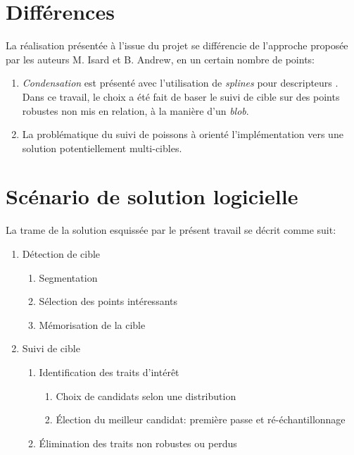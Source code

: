 \documentclass[a4paper,11pt]{report}
\begin{document}

\section{Différences}
La réalisation présentée à l'issue du projet se différencie de l'approche proposée par les auteurs M. Isard et B. Andrew, en un certain nombre de points:
\begin{enumerate}
\item \textit{Condensation} est présenté avec l'utilisation de \textit{splines} pour descripteurs \cite{condIsard}. Dans ce travail, le choix a été fait de baser le suivi de cible sur des points robustes non mis en relation, à la manière d'un \textit{blob}.
\item La problématique du suivi de poissons à orienté l'implémentation vers une solution potentiellement multi-cibles.
\end{enumerate}


\section{Scénario de solution logicielle}
La trame de la solution esquissée par le présent travail se décrit comme suit:
\begin{enumerate}
	\item Détection de cible
	\begin{enumerate}
		\item Segmentation
		\item Sélection des points intéressants
		\item Mémorisation de la cible
	\end{enumerate}
	\item Suivi de cible
	\begin{enumerate}
		\item Identification des traits d'intérêt
		\begin{enumerate}
			\item Choix de candidats selon une distribution
			\item Élection du meilleur candidat: première passe et ré-échantillonnage
		\end{enumerate}
		\item Élimination des traits non robustes ou perdus\\
	\end{enumerate}
\end{enumerate}
\end{document}

